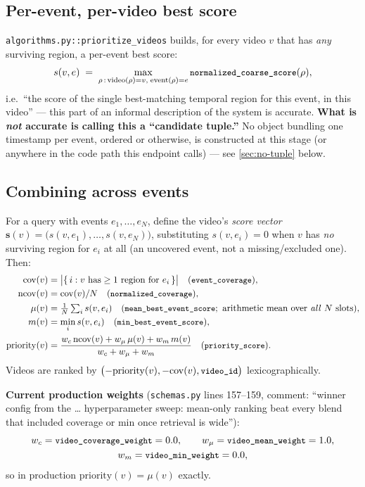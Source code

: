 \documentclass[11pt]{article}
\newcommand{\code}[1]{\texttt{\small #1}}
\newcommand{\file}[1]{\texttt{\footnotesize #1}}
\newcommand{\corr}[1]{\textbf{\textcolor{red!60!black}{#1}}}
\begin{document}
\subsection{Per-event, per-video best score}
\file{algorithms.py::prioritize\_videos} builds, for every video $v$ that has
\emph{any} surviving region, a per-event best score:
\begin{equation}
  s(v, e) \;=\; \max_{\rho \,:\, \mathrm{video}(\rho)=v,\; \mathrm{event}(\rho)=e}
    \code{normalized\_coarse\_score}(\rho),
  \label{eq:best-event-score}
\end{equation}
i.e.\ ``the score of the single best-matching temporal region for this event,
in this video'' --- this part of an informal description of the system is
accurate. \corr{What is \emph{not} accurate is calling this a ``candidate
tuple.''} No object bundling one timestamp per event, ordered or otherwise,
is constructed at this stage (or anywhere in the code path this endpoint
calls) --- see \ref{sec:no-tuple} below.

\subsection{Combining across events}
For a query with events $e_1,\dots,e_N$, define the video's \emph{score
vector} $\mathbf{s}(v) = \big(s(v,e_1),\dots,s(v,e_N)\big)$, substituting
$s(v,e_i) = 0$ when $v$ has \emph{no} surviving region for $e_i$ at all (an
uncovered event, not a missing/excluded one). Then:
\begin{align}
  \mathrm{cov}(v) &= \bigl|\{\, i : v \text{ has} \ge 1 \text{ region for } e_i \,\}\bigr|
    \quad(\code{event\_coverage}),\\
  \mathrm{ncov}(v) &= \mathrm{cov}(v) / N \quad(\code{normalized\_coverage}),\\
  \mu(v) &= \tfrac{1}{N}\textstyle\sum_i s(v,e_i) \quad(\code{mean\_best\_event\_score};
    \text{ arithmetic mean over \emph{all} $N$ slots}),\\
  m(v) &= \min_i s(v,e_i) \quad(\code{min\_best\_event\_score}),\\
  \mathrm{priority}(v) &= \frac{w_c\, \mathrm{ncov}(v) + w_\mu\, \mu(v) + w_m\, m(v)}
    {w_c + w_\mu + w_m} \quad(\code{priority\_score}).
  \label{eq:priority}
\end{align}
Videos are ranked by $\bigl(-\mathrm{priority}(v), -\mathrm{cov}(v),
\code{video\_id}\bigr)$ lexicographically.

\textbf{Current production weights} (\file{schemas.py} lines 157--159,
comment: ``winner config from the \dots{} hyperparameter sweep: mean-only
ranking beat every blend that included coverage or min once retrieval is
wide''):
\begin{gather*}
  w_c = \code{video\_coverage\_weight} = 0.0, \qquad
  w_\mu = \code{video\_mean\_weight} = 1.0, \\
  w_m = \code{video\_min\_weight} = 0.0,
\end{gather*}
so in production $\mathrm{priority}(v) = \mu(v)$ exactly.
\end{document}
